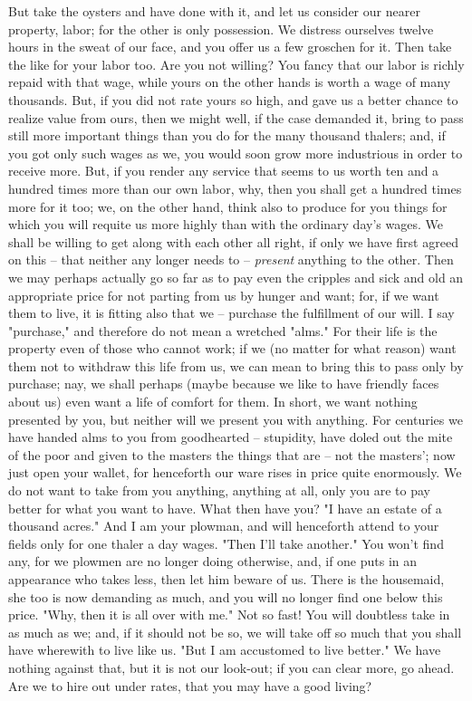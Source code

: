 But take the oysters and have done with it, and let us consider our nearer 
property, labor; for the other is only possession. We distress ourselves 
twelve hours in the sweat of our face, and you offer us a few groschen for it. 
Then take the like for your labor too. Are you not willing? You fancy that our 
labor is richly repaid with that wage, while yours on the other hands is worth 
a wage of many thousands. But, if you did not rate yours so high, and gave us 
a better chance to realize value from ours, then we might well, if the case 
demanded it, bring to pass still more important things than you do for the 
many thousand thalers; and, if you got only such wages as we, you would soon 
grow more industrious in order to receive more. But, if you render any service 
that seems to us worth ten and a hundred times more than our own labor, why, 
then you shall get a hundred times more for it too; we, on the other hand, 
think also to produce for you things for which you will requite us more highly 
than with the ordinary day's wages. We shall be willing to get along with each 
other all right, if only we have first agreed on this -- that neither any 
longer needs to -- \textit{present} anything to the other. Then we may perhaps 
actually go so far as to pay even the cripples and sick and old an appropriate 
price for not parting from us by hunger and want; for, if we want them to 
live, it is fitting also that we -- purchase the fulfillment of our will. I 
say "{}purchase,"{} and therefore do not mean a wretched "{}alms."{} For their 
life is the property even of those who cannot work; if we (no matter for what 
reason) want them not to withdraw this life from us, we can mean to bring this 
to pass only by purchase; nay, we shall perhaps (maybe because we like to have 
friendly faces about us) even want a life of comfort for them. In short, we 
want nothing presented by you, but neither will we present you with anything. 
For centuries we have handed alms to you from goodhearted -- stupidity, have 
doled out the mite of the poor and given to the masters the things that are -- 
not the masters'; now just open your wallet, for henceforth our ware rises in 
price quite enormously. We do not want to take from you anything, anything at 
all, only you are to pay better for what you want to have. What then have you? 
"{}I have an estate of a thousand acres."{} And I am your plowman, and will 
henceforth attend to your fields only for one thaler a day wages. "{}Then I'll 
take another."{} You won't find any, for we plowmen are no longer doing 
otherwise, and, if one puts in an appearance who takes less, then let him 
beware of us. There is the housemaid, she too is now demanding as much, and 
you will no longer find one below this price. "{}Why, then it is all over with 
me."{} Not so fast! You will doubtless take in as much as we; and, if it 
should not be so, we will take off so much that you shall have wherewith to 
live like us. "{}But I am accustomed to live better."{} We have nothing 
against that, but it is not our look-out; if you can clear more, go ahead. Are 
we to hire out under rates, that you may have a good living?

